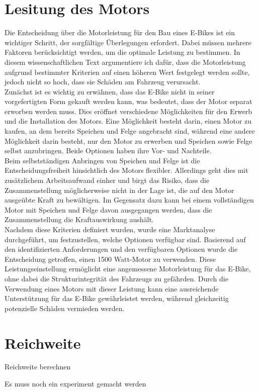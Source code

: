 \section{Lesitung des Motors}

Die Entscheidung über die Motorleistung für den Bau eines E-Bikes ist ein wichtiger Schritt, der sorgfältige Überlegungen erfordert. Dabei müssen mehrere Faktoren berücksichtigt werden, um die optimale Leistung zu bestimmen. In diesem wissenschaftlichen Text argumentiere ich dafür, dass die Motorleistung aufgrund bestimmter Kriterien auf einen höheren Wert festgelegt werden sollte, jedoch nicht so hoch, dass sie Schäden am Fahrzeug verursacht.\\

Zunächst ist es wichtig zu erwähnen, dass das E-Bike nicht in seiner vorgefertigten Form gekauft werden kann, was bedeutet, dass der Motor separat erworben werden muss. Dies eröffnet verschiedene Möglichkeiten für den Erwerb und die Installation des Motors. Eine Möglichkeit besteht darin, einen Motor zu kaufen, an dem bereits Speichen und Felge angebracht sind, während eine andere Möglichkeit darin besteht, nur den Motor zu erwerben und Speichen sowie Felge selbst anzubringen. Beide Optionen haben ihre Vor- und Nachteile.\\

Beim selbstständigen Anbringen von Speichen und Felge ist die Entscheidungsfreiheit hinsichtlich des Motors flexibler. Allerdings geht dies mit zusätzlichem Arbeitsaufwand einher und birgt das Risiko, dass die Zusammenstellung möglicherweise nicht in der Lage ist, die auf den Motor ausgeübte Kraft zu bewältigen. Im Gegensatz dazu kann bei einem vollständigen Motor mit Speichen und Felge davon ausgegangen werden, dass die Zusammenstellung die Kraftauswirkung aushält.\\

Nachdem diese Kriterien definiert wurden, wurde eine Marktanalyse durchgeführt, um festzustellen, welche Optionen verfügbar sind. Basierend auf den identifizierten Anforderungen und den verfügbaren Optionen wurde die Entscheidung getroffen, einen 1500 Watt-Motor zu verwenden. Diese Leistungseinstellung ermöglicht eine angemessene Motorleistung für das E-Bike, ohne dabei die Strukturintegrität des Fahrzeugs zu gefährden. Durch die Verwendung eines Motors mit dieser Leistung kann eine ausreichende Unterstützung für das E-Bike gewährleistet werden, während gleichzeitig potenzielle Schäden vermieden werden.\\





\section{Reichweite}
Reichweite berechnen

Es muss noch ein experiment gemacht werden 




